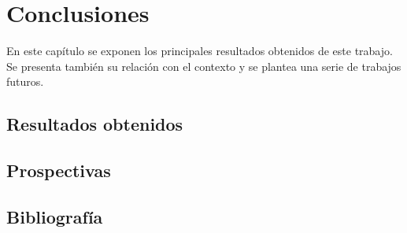 
\chapter{Conclusiones} %
En este capítulo se exponen los principales resultados obtenidos de este trabajo. Se presenta también su relación con el contexto y se plantea una serie de trabajos futuros.\\

\pagebreak
\section{Resultados obtenidos}

\pagebreak
\section{Prospectivas}

\pagebreak
\section{Bibliografía}